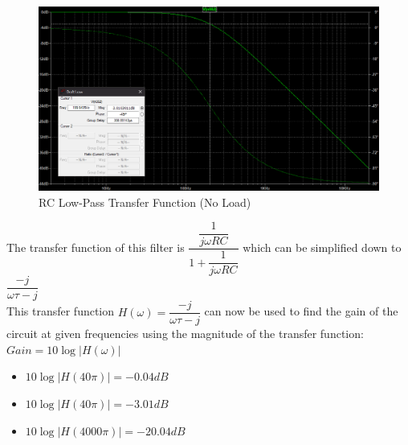 \documentclass[a4paper,11pt]{article}
\begin{document}
\begin{flushleft}
\begin{enumerate}
			\begin{figure}[ht]
				\centering
				\includegraphics[width=\linewidth]{RC_transfer_function}
				\caption{RC Low-Pass Transfer Function (No Load)}
			\end{figure}
			The transfer function of this filter is $ \dfrac{\dfrac{1}{j\omega RC}}{1+\dfrac{1}{j\omega 				RC}}$ which can be simplified down to $ \dfrac{-j}{\omega\tau -j}$\\
			This transfer function $H(\omega) = \dfrac{-j}{\omega\tau -j}$ can now be used to find the 					gain of the circuit at given frequencies using the magnitude of the transfer function: $Gain 			= 10\log|H(\omega)|$\\
			\begin{itemize}
				\item
				$10\log|H(40\pi)| = -0.04 dB$
				\item
				$10\log|H(40\pi)| = -3.01 dB$
				\item
				$10\log|H(4000\pi)| = -20.04 dB$
			\end{itemize}
			

\end{enumerate}
\end{flushleft}
\end{document}
